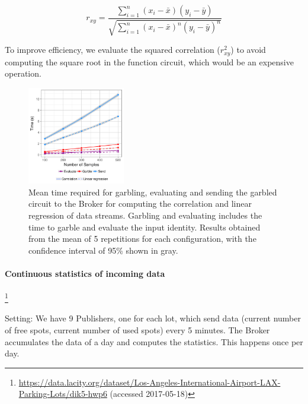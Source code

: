 \[
r_{xy} = \frac{\displaystyle\sum_{i=1}^n (x_i - \bar{x}) (y_i - \bar{y})}
{\sqrt{\displaystyle\sum_{i=1}^n (x_i - \bar{x})^n (y_i - \bar{y})^n}}
\]
\bigskip

To improve efficiency, we evaluate the squared correlation ($r_{xy}^2$) to avoid
computing the square root in the function circuit, which would be an expensive
operation.

\begin{figure}
  \includegraphics[width=0.38\textwidth]{plots/stream.png}
  \caption{Mean time required for garbling, evaluating and sending the garbled
    circuit to the Broker for computing the correlation and linear regression
    of data streams.  Garbling and evaluating includes the time to garble and
    evaluate the input identity.  Results obtained from the mean of 5
    repetitions for each configuration, with the confidence interval of 95\%
    shown in gray.}
  \label{stream-times}
\end{figure}

\paragraph{Continuous statistics of incoming data}

\footnote{\url{https://data.lacity.org/dataset/Los-Angeles-International-Airport-LAX-Parking-Lots/dik5-hwp6} (accessed 2017-05-18)}



Setting: We have 9 Publishers, one for each lot, which send data (current
number of free spots, current number of used spots) every 5 minutes.  The
Broker accumulates the data of a day and computes the statistics.  This
happens once per day.

